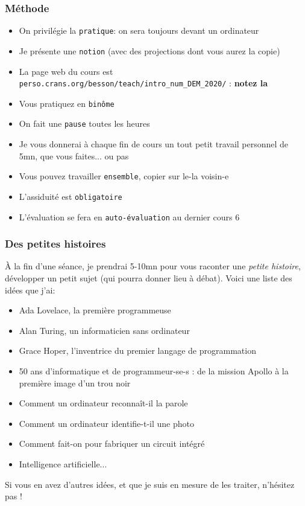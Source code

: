 \documentclass{beamer}
\newcommand{\mypause}{\pause}
\newcommand{\prog}[1]{\alert{\texttt{#1}}}
\begin{document}
\frame
{
  \frametitle{Méthode}

  \begin{itemize}
  \item On privilégie la \prog{pratique}: on sera toujours devant un ordinateur\mypause{}
  \item Je présente une \prog{notion} (avec des projections dont vous aurez la copie)\mypause{}
  \item La page web du cours est \texttt{perso.crans.org/besson/teach/intro\_num\_DEM\_2020/} : \textbf{notez la}
  \item Vous pratiquez en \prog{binôme}\mypause{}
  \item On fait une \prog{pause} toutes les heures\mypause{}
  \item Je vous donnerai à chaque fin de cours un tout petit travail personnel de 5mn,
  que vous faites... ou pas\mypause{}
  \item Vous pouvez travailler \prog{ensemble}, copier sur le-la voisin-e\mypause{}
  \item L'assiduité est \prog{obligatoire}\mypause{}
  \item L'évaluation se fera en \prog{auto-évaluation} au dernier cours 6\mypause{}
  \end{itemize}
}

\frame
{
  \frametitle{Des petites histoires}
À la fin d'une séance, je prendrai 5-10mn pour vous raconter une {\em petite histoire}, développer
un petit sujet (qui pourra donner lieu à débat). Voici une liste des idées que j'ai:
  \begin{itemize}
  \item Ada Lovelace, la première programmeuse
  \item Alan Turing, un informaticien sans ordinateur
  \item Grace Hoper, l'inventrice du premier langage de programmation
  \item 50 ans d'informatique et de programmeur-se-s : de la mission Apollo à la première image d'un trou noir
  \item Comment un ordinateur reconnaît-il la parole
  \item Comment un ordinateur identifie-t-il une photo
  \item Comment fait-on pour fabriquer un circuit intégré
  \item Intelligence artificielle...
  \end{itemize}
  
Si vous en avez d'autres idées, et que je suis en mesure de les traiter, n'hésitez pas !
}
\end{document}
